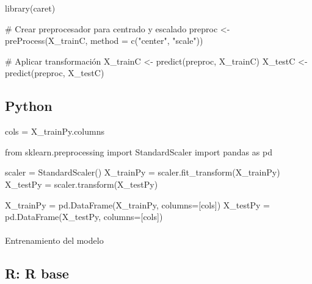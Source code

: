 \documentclass[
  letterpaper,
  DIV=11,
  numbers=noendperiod]{scrartcl}
\makeatletter
\let\oldparagraph\paragraph
\renewcommand{\paragraph}{
    \@ifstar
      \xxxParagraphStar
      \xxxParagraphNoStar
  }
\newcommand{\xxxParagraphStar}[1]{\oldparagraph*{#1}\mbox{}}
\newcommand{\xxxParagraphNoStar}[1]{\oldparagraph{#1}\mbox{}}
\newenvironment{Shaded}{\begin{snugshade}}{\end{snugshade}}
\newcommand{\AttributeTok}[1]{\textcolor[rgb]{0.40,0.45,0.13}{#1}}
\newcommand{\CommentTok}[1]{\textcolor[rgb]{0.37,0.37,0.37}{#1}}
\newcommand{\FunctionTok}[1]{\textcolor[rgb]{0.28,0.35,0.67}{#1}}
\newcommand{\ImportTok}[1]{\textcolor[rgb]{0.00,0.46,0.62}{#1}}
\newcommand{\NormalTok}[1]{\textcolor[rgb]{0.00,0.23,0.31}{#1}}
\newcommand{\OperatorTok}[1]{\textcolor[rgb]{0.37,0.37,0.37}{#1}}
\newcommand{\OtherTok}[1]{\textcolor[rgb]{0.00,0.23,0.31}{#1}}
\newcommand{\StringTok}[1]{\textcolor[rgb]{0.13,0.47,0.30}{#1}}
\makeatother
\begin{document}
\begin{Shaded}
\begin{Highlighting}[]
\FunctionTok{library}\NormalTok{(caret)}

\CommentTok{\# Crear preprocesador para centrado y escalado}
\NormalTok{preproc }\OtherTok{\textless{}{-}} \FunctionTok{preProcess}\NormalTok{(X\_trainC, }\AttributeTok{method =} \FunctionTok{c}\NormalTok{(}\StringTok{"center"}\NormalTok{, }\StringTok{"scale"}\NormalTok{))}

\CommentTok{\# Aplicar transformación}
\NormalTok{X\_trainC }\OtherTok{\textless{}{-}} \FunctionTok{predict}\NormalTok{(preproc, X\_trainC)}
\NormalTok{X\_testC }\OtherTok{\textless{}{-}} \FunctionTok{predict}\NormalTok{(preproc, X\_testC)}
\end{Highlighting}
\end{Shaded}

\subsection{Python}

\begin{Shaded}
\begin{Highlighting}[]
\NormalTok{cols }\OperatorTok{=}\NormalTok{ X\_trainPy.columns}

\ImportTok{from}\NormalTok{ sklearn.preprocessing }\ImportTok{import}\NormalTok{ StandardScaler}
\ImportTok{import}\NormalTok{ pandas }\ImportTok{as}\NormalTok{ pd}

\NormalTok{scaler }\OperatorTok{=}\NormalTok{ StandardScaler()}
\NormalTok{X\_trainPy }\OperatorTok{=}\NormalTok{ scaler.fit\_transform(X\_trainPy)}
\NormalTok{X\_testPy }\OperatorTok{=}\NormalTok{ scaler.transform(X\_testPy)}

\NormalTok{X\_trainPy }\OperatorTok{=}\NormalTok{ pd.DataFrame(X\_trainPy, columns}\OperatorTok{=}\NormalTok{[cols])}
\NormalTok{X\_testPy }\OperatorTok{=}\NormalTok{ pd.DataFrame(X\_testPy, columns}\OperatorTok{=}\NormalTok{[cols])}
\end{Highlighting}
\end{Shaded}

\paragraph{Entrenamiento del modelo}\label{entrenamiento-del-modelo}

\subsection{R: R base}
\end{document}
